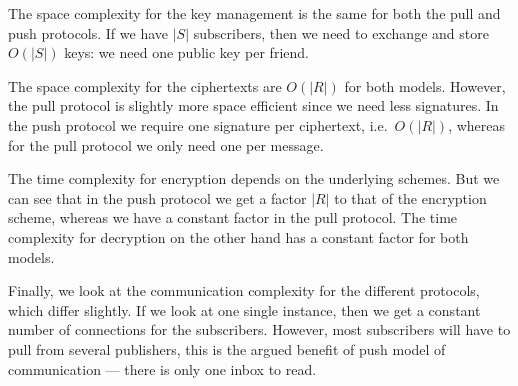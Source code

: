 The space complexity for the key management is the same for both the pull and 
push protocols.
If we have \(|S|\) subscribers, then we need to exchange and store \(O(|S|)\) 
keys:
we need one public key per friend.

The space complexity for the ciphertexts are \(O(|R|)\) for both models.
However, the pull protocol is slightly more space efficient since we need less 
signatures.
In the push protocol we require one signature per ciphertext, i.e.\ \(O(|R|)\), 
whereas for the pull protocol we only need one per message.

The time complexity for encryption depends on the underlying schemes.
But we can see that in the push protocol we get a factor \(|R|\) to that of the 
encryption scheme, whereas we have a constant factor in the pull protocol.
The time complexity for decryption on the other hand has a constant factor for 
both models.

Finally, we look at the communication complexity for the different protocols, 
which differ slightly.
If we look at one single instance, then we get a constant number of connections
for the subscribers.
However, most subscribers will have to pull from several publishers, this is 
the argued benefit of push model of communication --- there is only one inbox 
to read.

%


